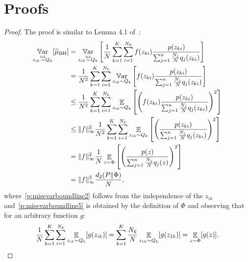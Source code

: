 \documentclass{article}
\begin{document}
\section{Proofs}\label{app:proof}

\misevarbound*
%
\begin{proof}
	The proof is similar to Lemma 4.1 of~\cite{metelli2018policy}:
    \begin{align}
    \mathop{\mathbb{V}\mathrm{ar}}_{z_{ik} \stackrel{\text{iid}}{\sim} Q_k} [\widehat{\mu}_{\text{BH}}]&  = \mathop{\mathbb{V}\mathrm{ar}}_{z_{ik} \stackrel{\text{iid}}{\sim} Q_k} \left[ \frac{1}{N} \sum_{k=1}^K \sum_{i=1}^{N_k}  f(z_{ki})\frac{p(z_{ki})}{\sum_{j=1}^n \frac{N_j}{N} q_j(z_{ki})} \right] \notag \\
    & = \frac{1}{N^2} \sum_{k=1}^K \sum_{i=1}^{N_k} \mathop{\mathbb{V}\mathrm{ar}}_{z_{ik} \sim Q_k} \left[   f(z_{ki}) \frac{p(z_{ki})}{\sum_{j=1}^n \frac{N_j}{N} q_j(z_{ki})} \right] \label{p:misevarboundline2} \\
    & \le \frac{1}{N^2} \sum_{k=1}^K \sum_{i=1}^{N_k} \mathop{\mathbb{E}}_{z_{ik} \sim Q_k} \left[   \left( f(z_{ki})   \frac{p(z_{ki})}{\sum_{j=1}^n \frac{N_j}{N} q_j(z_{ki})} \right)^2 \right] \notag\\
    & \le \|f\|_{\infty}^2 \frac{1}{N^2} \sum_{k=1}^K \sum_{i=1}^{N_k} \mathop{\mathbb{E}}_{z_{ik} \sim Q_k} \left[   \left( \frac{p(z_{ki})}{\sum_{j=1}^n \frac{N_j}{N} q_j(z_{ki})} \right)^2 \right]  \notag\\
    & = \|f\|_{\infty}^2 \frac{1}{N} \mathop{\mathbb{E}}_{z \sim \Phi} \left[ \left(\frac{p(z)}{\sum_{j=1}^n \frac{N_j}{N} q_j(z)} \right)^2 \right] \label{p:misevarboundline5}\\
    &= \|f\|_{\infty}^2 \frac{d_{2}(P\|\Phi)}{N},  \notag
    \end{align}
    where~\eqref{p:misevarboundline2} follows from the independence of the $z_{ik}$ and~\eqref{p:misevarboundline5} is obtained by the definition of $\Phi$ and observing that for an arbitrary function $g$:
    \begin{equation}
    \label{eq:expectationdecomposition}
    	\frac{1}{N} \sum_{k=1}^K \sum_{i=1}^{N_k} \mathop{\mathbb{E}}_{z_{ik} \sim Q_k}[g(z_{ik})] =  \sum_{k=1}^K \frac{N_k}{N} \mathop{\mathbb{E}}_{z_{1k} \sim Q_k}[g(z_{1k})] = \mathop{\mathbb{E}}_{z \sim \Phi}[g(z)].
    \end{equation}
\end{proof}
\end{document}
